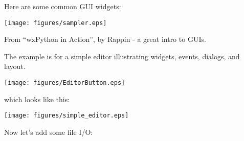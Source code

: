 {{\vskip 18pt
Here are some common GUI widgets:

\texttt{[image: figures/sampler.eps]} 

From ``wxPython in Action'', by Rappin - a great intro to GUIs.

\noindent The example is for a simple editor  illustrating widgets, events, dialogs, and layout.



\texttt{[image: figures/EditorButton.eps]} 

\noindent which looks like this:

\texttt{[image: figures/simple\_editor.eps]} 


\noindent Now let's add some file I/O:


}}
